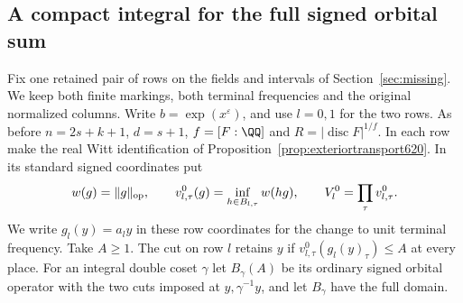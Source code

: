 \documentclass[a4paper,11pt]{article}
\theoremstyle{definition}
\theoremstyle{remark}
\numberwithin{equation}{section}
\begin{document}
\subsection{A compact integral for the full signed orbital sum}
\label{sec:signedkernel621}

Fix one retained pair of rows on the fields and intervals of
Section~\ref{sec:missing}. We keep both finite markings, both
terminal frequencies and the original normalized columns. Write
\(b=\exp(x^\varepsilon)\), and use \(l=0,1\) for the two rows.
As before \(n=2s+k+1\), \(d=s+1\), \(f=[F:\QQ]\) and
\(R=|\operatorname{disc}F|^{1/f}\). In each row make the real
Witt identification of Proposition~\ref{prop:exteriortransport620}.
In its standard signed coordinates put
\[
 w(g)=\|g\|_{\rm op},\qquad
 v^0_{l,\tau}(g)=\inf_{h\in B_{l,\tau}}w(hg),\qquad
 V_l^0=\prod_\tau v^0_{l,\tau}.
\]
We write \(g_l(y)=a_l y\) in these row coordinates for the change
to unit terminal frequency. Take \(A\ge1\). The cut on row \(l\)
retains \(y\) if \(v^0_{l,\tau}(g_l(y)_\tau)\le A\) at every
place. For an integral double coset \(\gamma\) let \(B_\gamma(A)\)
be its ordinary signed orbital operator with the two cuts imposed
at \(y,\gamma^{-1}y\), and let \(B_\gamma\) have the full domain.
\end{document}

